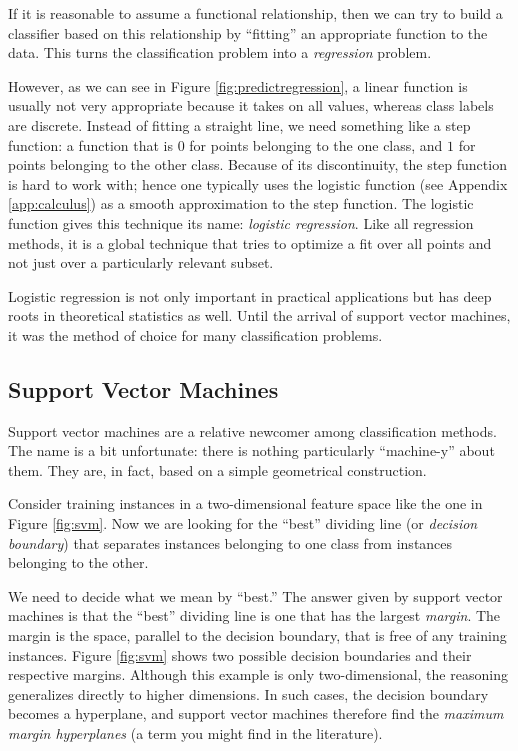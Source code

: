 If it is reasonable to assume a functional relationship, then we can
try to build a classifier based on this relationship by ``fitting'' an
appropriate function to the data. This turns the classification
problem into a \emph{regression} problem.

However, as we can see in Figure \ref{fig:predictregression}, a linear
function is usually not very appropriate because it takes on all
values, whereas class labels are discrete. Instead of fitting a
straight line, we need something like a step function: a function that
is $0$ for points belonging to the one class, and $1$ for points
belonging\vadjust{\pagebreak} to the other class. Because of its discontinuity, the step
function is hard to work with; hence one typically uses the logistic
function (see Appendix \ref{app:calculus}) as a smooth approximation
to the step function.  The logistic function gives this technique its
name: \emph{logistic regression}. Like all regression methods, it is a
global technique that tries to optimize a fit over all points and not
just over a particularly relevant subset.

Logistic regression is not only important in practical applications
but has deep roots in theoretical statistics as well. Until the
arrival of support vector machines, it was the method of choice for
many classification problems.\vspace*{-4pt}


\subsection{Support Vector Machines}


Support vector machines are a relative newcomer among classification
methods. The name is a bit unfortunate: there is nothing particularly
``machine-y'' about them. They are, in fact, based on a simple
geometrical construction.

Consider training instances in a two-dimensional feature space like
the one in Figure \ref{fig:svm}. Now we are looking for the ``best''
dividing line (or \emph{decision boundary})  that separates instances
belonging to one class from instances belonging to the other.



We need to decide what we mean by ``best.''  The answer given by
support vector machines is that the ``best'' dividing line is one that
has the largest \emph{margin}. The margin is the space, parallel to
the decision boundary, that is free of any training instances.  Figure
\ref{fig:svm} shows two possible decision boundaries and their
respective margins. Although this example is only two-dimensional, the
reasoning generalizes directly to higher dimensions. In such cases,
the decision boundary becomes a hyperplane, and support vector
machines therefore find the \emph{maximum margin hyperplanes}  (a term
you might find in the literature).


